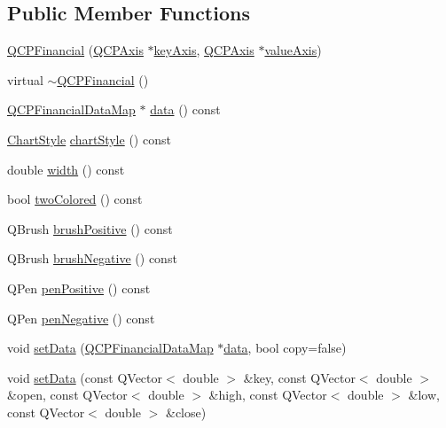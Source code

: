 \subsection*{Public Member Functions}
\begin{DoxyCompactItemize}
\item 
\hyperlink{class_q_c_p_financial_a4702d5248feeb9d1ec6e3ce725b10b32}{Q\+C\+P\+Financial} (\hyperlink{class_q_c_p_axis}{Q\+C\+P\+Axis} $\ast$\hyperlink{class_q_c_p_abstract_plottable_a72c7a09c22963f2c943f07112b311103}{key\+Axis}, \hyperlink{class_q_c_p_axis}{Q\+C\+P\+Axis} $\ast$\hyperlink{class_q_c_p_abstract_plottable_a3106f9d34d330a6097a8ec5905e5b519}{value\+Axis})
\item 
virtual \hyperlink{class_q_c_p_financial_ad1fda0d793797b66819fac4682b10f31}{$\sim$\+Q\+C\+P\+Financial} ()
\item 
\hyperlink{qcustomplot_8h_a745c09823fae0974b50beca9bc3b3d7d}{Q\+C\+P\+Financial\+Data\+Map} $\ast$ \hyperlink{class_q_c_p_financial_a58e05aefa057d16edfcc0334cf81c241}{data} () const 
\item 
\hyperlink{class_q_c_p_financial_a0f800e21ee98d646dfc6f8f89d10ebfb}{Chart\+Style} \hyperlink{class_q_c_p_financial_a0888c9308cc5fcb4daa70184f9582412}{chart\+Style} () const 
\item 
double \hyperlink{class_q_c_p_financial_a71ccaa04cdade0ec08a2117db6e4a4ce}{width} () const 
\item 
bool \hyperlink{class_q_c_p_financial_a2bab30fc4eee38a0da3a05846b8d7ac7}{two\+Colored} () const 
\item 
Q\+Brush \hyperlink{class_q_c_p_financial_acb69536a334fae7fc31b2bfd4eca81f5}{brush\+Positive} () const 
\item 
Q\+Brush \hyperlink{class_q_c_p_financial_a91e09b31ce341c17b917e77fdc68d84e}{brush\+Negative} () const 
\item 
Q\+Pen \hyperlink{class_q_c_p_financial_a544899bde79d06e17ccefcb9926d87ce}{pen\+Positive} () const 
\item 
Q\+Pen \hyperlink{class_q_c_p_financial_a557fe911aa04f70c1734c8fa09994148}{pen\+Negative} () const 
\item 
void \hyperlink{class_q_c_p_financial_adf12a86082f1e488df6a4e8603f8fd6d}{set\+Data} (\hyperlink{qcustomplot_8h_a745c09823fae0974b50beca9bc3b3d7d}{Q\+C\+P\+Financial\+Data\+Map} $\ast$\hyperlink{class_q_c_p_financial_a58e05aefa057d16edfcc0334cf81c241}{data}, bool copy=false)
\item 
void \hyperlink{class_q_c_p_financial_a886881339d6447432af55adaad748c3c}{set\+Data} (const Q\+Vector$<$ double $>$ \&key, const Q\+Vector$<$ double $>$ \&open, const Q\+Vector$<$ double $>$ \&high, const Q\+Vector$<$ double $>$ \&low, const Q\+Vector$<$ double $>$ \&close)

\end{DoxyCompactItemize}
